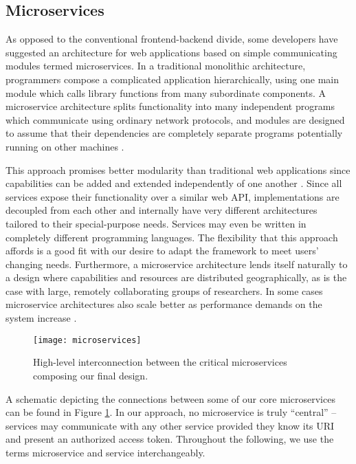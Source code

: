 \documentclass[../thesis]{subfiles}
\begin{document}
\subsection{Microservices}
As opposed to the conventional \gls{frontend}-\gls{backend} divide, some
developers have suggested an architecture for web applications based
on simple communicating modules termed \glspl{microservice}. In a
traditional monolithic architecture, programmers compose a complicated
application hierarchically, using one main module which calls library
functions from many subordinate components.  A microservice
architecture splits functionality into many independent programs which
communicate using ordinary network protocols, and modules are designed
to assume that their dependencies are completely separate programs
potentially running on other machines \cite{Micro14:online}.

This approach promises better modularity than traditional web
applications since capabilities can be added and extended
independently of one another \cite{Balalaie2016}. Since all services
expose their functionality over a similar web \gls{API},
implementations are decoupled from each other and internally have very
different architectures tailored to their special-purpose needs.
Services may even be written in completely different programming
languages. The flexibility that this approach affords is a good fit
with our desire to adapt the framework to meet users' changing
needs. Furthermore, a microservice architecture lends itself naturally
to a design where capabilities and resources are distributed
geographically, as is the case with large, remotely collaborating
groups of researchers. In some cases microservice architectures also
scale better as performance demands on the system increase
\cite{wolff2016microservices}.

\begin{figure}
  \texttt{[image: microservices]}
  \caption[Microservice-based web architecture]{
    High-level interconnection between the critical microservices
    composing our final design.
    \label{fig:Microservices}
  }
\end{figure}

A schematic depicting the connections between some of our core
microservices can be found in Figure \ref{fig:Microservices}.
In our approach, no microservice is truly ``central'' -- services may
communicate with any other service provided they know its URI and
present an authorized access token.
Throughout the following, we use the terms microservice and service
interchangeably.
\end{document}
